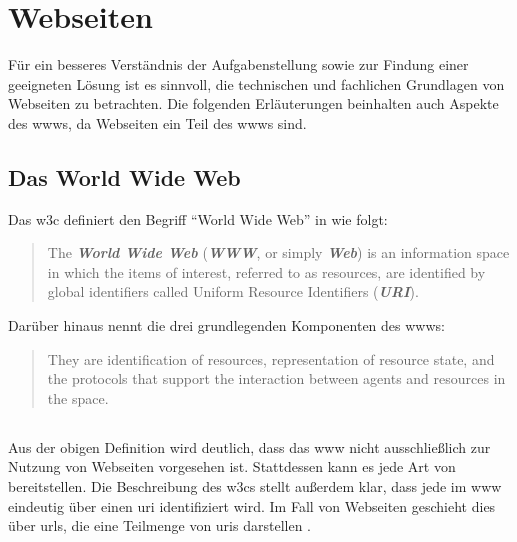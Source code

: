 \section{Webseiten}
    \label{section:problemAnalysisWebpagesInTheWWW}
    Für ein besseres Verständnis der Aufgabenstellung sowie zur Findung
    einer geeigneten Lösung ist es sinnvoll, die technischen und fachlichen
    Grundlagen von Webseiten zu betrachten.
    Die folgenden Erläuterungen beinhalten auch Aspekte des \glspl{www},
    da Webseiten ein Teil des \glspl{www} sind.

    \subsection{Das World Wide Web}
        Das \gls{w3c} definiert den Begriff "`World Wide Web"' in \cite{w3c:wwwArch} wie folgt:

        \begin{quote}
            The \textit{\textbf{World Wide Web}} (\textit{\textbf{WWW}}, or simply \textit{\textbf{Web}})
            is an information space in which the items of interest, referred to as resources,
            are identified by global identifiers called Uniform Resource Identifiers (\textit{\textbf{URI}}).
        \end{quote}

        Darüber hinaus nennt \cite{w3c:wwwArch} die drei grundlegenden Komponenten des \glspl{www}:

        \begin{quote}
            They are identification of resources,
            representation of resource state, and the protocols
            that support the interaction between agents and resources in the space.
        \end{quote}

    \subsection{{\resources}}
        \label{section:problemAnalysisWebpagesInTheWWWResources}
        Aus der obigen Definition wird deutlich,
        dass das \gls{www} nicht ausschließlich zur Nutzung von Webseiten
        vorgesehen ist.
        Stattdessen kann es jede Art von {\resources} bereitstellen.
        Die Beschreibung des \glspl{w3c} stellt außerdem klar,
        dass jede {\resource} im \gls{www} eindeutig über einen \gls{uri} identifiziert wird.
        Im Fall von Webseiten geschieht dies über \glspl{url},
        die eine Teilmenge von \glspl{uri} darstellen
        \cite[Kapitel 1.1.3]{rfc:3986}.


